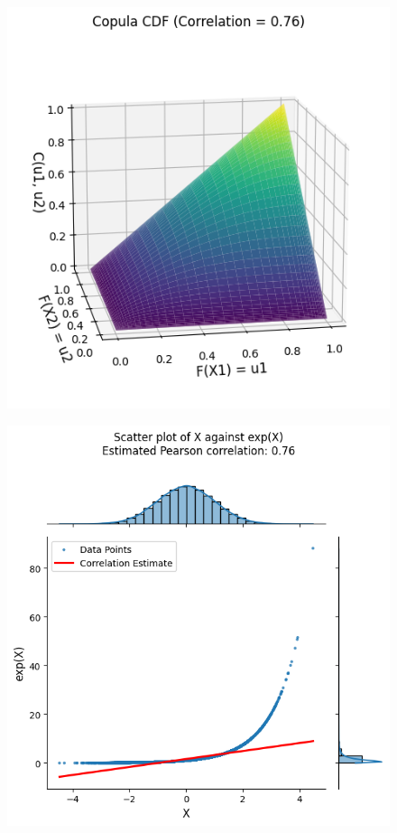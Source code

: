 \begin{figure}
\begin{minipage}{0.45\textwidth}
        \includegraphics[width=\textwidth]{3Theory/pictures/EstimatedCopula076.png}
        \label{fig:CorrelationEstimationExponential}
    \end{minipage}
    \vfill
    \begin{minipage}{0.45\textwidth}
        \centering
        \includegraphics[width=\textwidth]{3Theory/pictures/ExpXPlot.png}

\end{minipage}
\end{figure}
